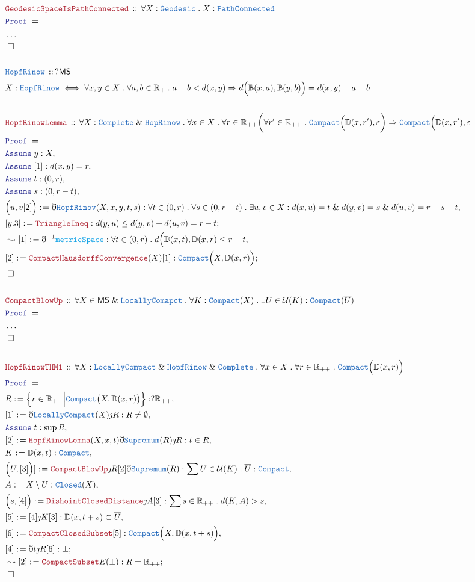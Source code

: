 \documentclass[12pt]{scrartcl}
\newcommand{\TYPE}[1]{\textcolor{NavyBlue}{\mathtt{#1}}}
\newcommand{\FUNC}[1]{\textcolor{Cerulean}{\mathtt{#1}}}
\newcommand{\LOGIC}[1]{\textcolor{Blue}{\mathtt{#1}}}
\newcommand{\THM}[1]{\textcolor{Maroon}{\mathtt{#1}}}
\renewcommand{\.}{\; . \;}
\newcommand{\de}{: \kern 0.1pc =}
\newcommand{\Theorem}[2]{& \THM{#1} \, :: \, #2 \\ & \Proof = \\ }
\newcommand{\DeclareType}[2]{& \TYPE{#1} \, :: \, #2 \\}
\newcommand{\DefineType}[3]{& #1 : \TYPE{#2} \iff #3 \\}
\newcommand{\Page}[1]{ \begin{align*} #1 \end{align*}   }
\newcommand{ \bd }{ \ByDef }
\newcommand{\NoProof}{ & \ldots \\ \EndProof}
\renewcommand{\And}{\; \& \;}
\newcommand{\Imply}{\Rightarrow}
\newcommand{\Reals}{\mathbb{R} }
\newcommand{\Say}[3]{& #1 \de #2 : #3, \\}
\newcommand{\Conclude}[3]{& #1 \de #2 : #3; \\}
\newcommand{\Derive}[3]{& \leadsto #1 \de #2 : #3, \\}
\newcommand{\DeriveConclude}[3]{& \leadsto #1 \de #2 : #3 ; \\}
\newcommand{\Assume}[2]{& \LOGIC{Assume} \; #1 : #2, \\}
\newcommand{\QED}{\; \square}
\newcommand{\EndProof}{& \QED \\}
\newcommand{\ByDef}{\eth}
\newcommand{\ByConstr}{\jmath}
\newcommand{\Proof}{\LOGIC{Proof} \; }
\renewcommand{\U}{\mathcal{U}}
\newcommand{\MS}{\mathsf{MS}}
\begin{document}
\Page{
	\Theorem{GeodesicSpaceIsPathConnected}{\forall X : \TYPE{Geodesic} \.  X : \TYPE{PathConnected}}
	\NoProof
	\\
	\DeclareType{HopfRinow}{?\MS}
	\DefineType{X}{HopfRinow}{\forall x,y \in X \. \forall a,b \in \Reals_{+} \. a + b < d(x,y) \Imply d\Big( \mathbb{B}(x,a),\mathbb{B}(y,b) \Big) = d(x,y) - a - b}
	\\
	\Theorem{HopfRinowLemma}
	{
		\forall  X  : \TYPE{Complete}  \And  \TYPE{HopRinow} \.
		\forall x \in X \. 
		\forall r \in \Reals_{++}
		\bigg( \forall r' \in \Reals_{++}  \.     \TYPE{Compact}\Big(\mathbb{D}(x,r') ,\varepsilon\bigg)
		\Imply 
		\TYPE{Compact}\Big(\mathbb{D}(x,r') ,\varepsilon  
	}
	\Assume{y}{X}
	\Assume{[1]}{d(x,y) = r}
	\Assume{t}{(0,r)}
	\Assume{s}{(0,r-t)}
	\Say{\Big( u,v [2]\Big)}{\bd \TYPE{HopfRinov}(X,x,y,t,s)}{\forall  t \in (0,r) \. \forall s \in (0,r-t) \. \exists u,v \in X : d(x,u) = t \And d(y,v) =  s \And d(u,v) = r - s -t }
	\Conclude{[y.3]}{\THM{TriangleIneq}}{ d(y,u ) \le d(y,v) + d(u,v) = r - t}
	\Derive{[1]}{\bd^{-1} \FUNC{metricSpace}}{\forall t \in (0,r) \. d\Big( \mathbb{D}(x,t),\mathbb{D}(x,r) \le r-t}
	\Conclude{[2]}{\THM{CompactHausdorffConvergence}(X)[1]}{\TYPE{Compact}\Big(X,\mathbb{D}(x,r)\Big)}
	\EndProof
	\\
	\Theorem{CompactBlowUp}{\forall X \in \MS \And \TYPE{LocallyComapct} \. \forall K : \TYPE{Compact}(X) \.  \exists U \in \mathcal{U}(K) :  \TYPE{Compact}(\overline{U})}
	\NoProof
	\\
	\Theorem{HopfRinowTHM1}{\forall  X : \TYPE{LocallyCompact} \And \TYPE{HopfRinow} \And \TYPE{Complete} \. \forall x \in X \. \forall r \in \Reals_{++} \. \TYPE{Compact}\Big(\mathbb{D}(x,r)\Big) }
	\Say{R}{ \Big\{ r \in \Reals_{++} \Big|  \TYPE{Compact}\big( X,\mathbb{D}(x,r) \big)   \Big\}}{?\Reals_{++}}
	\Say{[1]}{\bd \TYPE{LocallyCompact}(X) \ByConstr R}{R \neq \emptyset}
	\Assume{t}{\sup R}
	\Say{[2]}{\THM{HopfRinowLemma}(X,x,t)\bd \TYPE{Supremum}(R) \ByConstr R}{t \in R}
	\Say{K}{\mathbb{D}(x,t)}{\TYPE{Compact}}
	\Say{\Big( U,[3]\Big)]}{\THM{CompactBlowUp}\ByConstr R [2] \bd \TYPE{Supremum}(R) }{ \sum U \in \U(K) \. \overline{U} : \TYPE{Compact}}
	\Say{A}{X \setminus U}{\TYPE{Closed}(X)}
	\Say{\Big( s, [4] \Big)}{\THM{DishointClosedDistance}\ByConstr A [3]}{ \sum s \in \Reals_{++} \.  d(K,A) > s  }
	\Say{[5]}{[4]\ByConstr K [3]}{\mathbb{D}(x,t + s) \subset \overline{U}}
	\Say{[6]}{\THM{CompactClosedSubset}[5]}{\TYPE{Compact}\Big( X, \mathbb{D}(x,t + s) \Big)}
	\Conclude{[4]}{\bd t \ByConstr R  [6]}{\bot}
	\DeriveConclude{[2]}{\THM{CompactSubset}E(\bot)}{  R = \Reals_{++} }
	\EndProof
}
\end{document}
